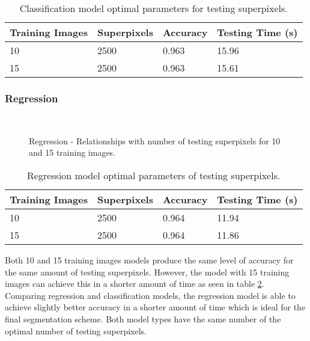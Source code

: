 \begin{table}[H]
\centering
\caption{Classification model optimal parameters for testing superpixels.}

\begin{tabular}{|l|l|l|l|}
\hline
 \textbf{Training Images} &	\textbf{Superpixels} & \textbf{Accuracy} & \textbf{Testing Time (s)}\\
\hline
10 & 2500 & 0.963 & 15.96\\
\hline				    	 			
15 & 2500 & 0.963 & 15.61\\	
\hline		    	 
\end{tabular}
\label{table:classtestpix}
\end{table}

\subsubsection{Regression}
\begin{figure}[H]
    \centering
    \\
    \caption{Regression - Relationships with number of testing superpixels for 10 and 15 training images.}%
    \label{reg:testpix}
\end{figure}


\begin{table}[H]
\centering
\caption{Regression model optimal parameters of testing superpixels.}

\begin{tabular}{|l|l|l|l|}
\hline
 \textbf{Training Images} &	\textbf{Superpixels} & \textbf{Accuracy} & \textbf{Testing Time (s)}\\
\hline
10 & 2500 & 0.964 & 11.94\\
\hline				    	 			
15 & 2500 & 0.964 & 11.86\\	
\hline		    	 
\end{tabular}
\label{table:regtestpix}
\end{table}

Both 10 and 15 training images models produce the same level of accuracy for the same amount of testing superpixels. However, the model with 15 training images can achieve this in a shorter amount of time as seen in table \ref{table:regtestpix}. 
\\[1\baselineskip]
Comparing regression and classification models, the regression model is able to achieve slightly better accuracy in a shorter amount of time which is ideal for the final segmentation scheme. Both model types have the same number of the optimal number of testing superpixels.

